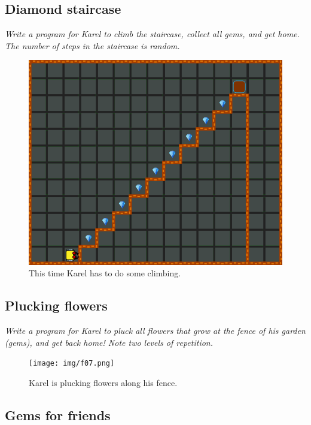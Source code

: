 \subsection{Diamond staircase}

{\em Write a program for Karel to climb the staircase, collect all gems, and 
get home. The number of steps in the staircase is random. }


\begin{figure}[!ht]
\begin{center}
\includegraphics[height=0.4\textwidth]{img/f06.png}
\end{center}
\vspace{-4mm}
\caption{This time Karel has to do some climbing.}
\vspace{-4mm}
\label{fig:f06}
\end{figure}



\subsection{Plucking flowers}

{\em Write a program for Karel to pluck all flowers that grow at the fence of his garden (gems), and get back home! Note two levels of repetition.}\\[-7mm]


\begin{figure}[!ht]
\begin{center}
\texttt{[image: img/f07.png]}
\end{center}
\vspace{-4mm}
\caption{Karel is plucking flowers along his fence.}
\vspace{-10mm}
\label{fig:f07}
\end{figure}
\newpage


\subsection{Gems for friends}

